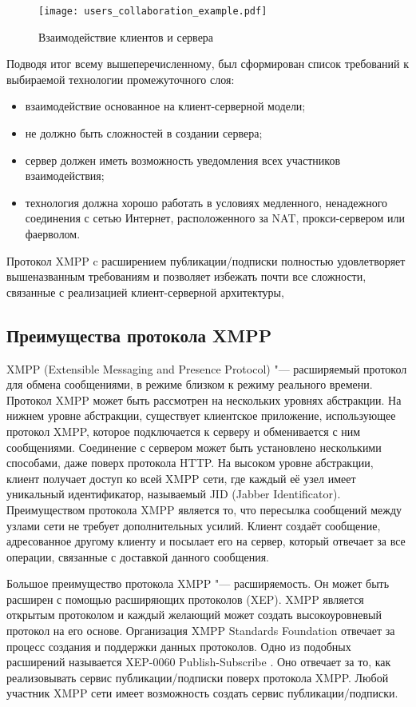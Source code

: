 \begin{figure}[!h]
  \centering
  \texttt{[image: users\_collaboration\_example.pdf]}
  \caption{Взаимодействие клиентов и сервера}
  \label{img:users_collaboration_example}
\end{figure} 

Подводя итог всему вышеперечисленному, был сформирован список требований к
выбираемой технологии промежуточного слоя:
\begin{itemize}
\item взаимодействие основанное на клиент-серверной модели;
\item не должно быть сложностей в создании сервера;
\item сервер должен иметь возможность уведомления всех участников
взаимодействия;
\item технология должна хорошо работать в условиях медленного, ненадежного
соединения с сетью Интернет, расположенного за NAT, прокси-сервером или
фаерволом.
\end{itemize}

Протокол XMPP c расширением публикации/подписки полностью удовлетворяет
вышеназванным требованиям и позволяет избежать почти все сложности, связанные с
реализацией клиент-серверной архитектуры, 

\subsection{Преимущества протокола XMPP}
XMPP (Extensible Messaging and Presence Protocol) "--- расширяемый протокол для
обмена сообщениями, в режиме близком к режиму реального времени. Протокол XMPP
может быть рассмотрен на нескольких уровнях абстракции. На нижнем уровне
абстракции, существует клиентское приложение, использующее протокол XMPP,
которое подключается к серверу и обменивается с ним сообщениями. Соединение с
сервером может быть установлено несколькими способами, даже поверх протокола
HTTP. На высоком уровне абстракции, клиент получает доступ ко всей XMPP сети,
где каждый её узел имеет уникальный идентификатор, называемый JID (Jabber
Identificator). Преимуществом протокола XMPP является то, что пересылка
сообщений между узлами сети не требует дополнительных усилий. Клиент создаёт
сообщение, адресованное другому клиенту и посылает его на сервер, который
отвечает за все операции, связанные с доставкой данного сообщения.

Большое преимущество протокола XMPP "--- расширяемость. Он может быть расширен с
помощью расширяющих протоколов (XEP). XMPP является открытым протоколом и каждый
желающий может создать высокоуровневый протокол на его основе. Организация XMPP
Standards Foundation отвечает за процесс создания и поддержки данных протоколов.
Одно из подобных расширений называется XEP-0060 Publish-Subscribe
\cite{xep-0060}. Оно отвечает за то, как реализовывать сервис
публикации/подписки поверх протокола XMPP. Любой участник XMPP сети имеет
возможность создать сервис публикации/подписки.

